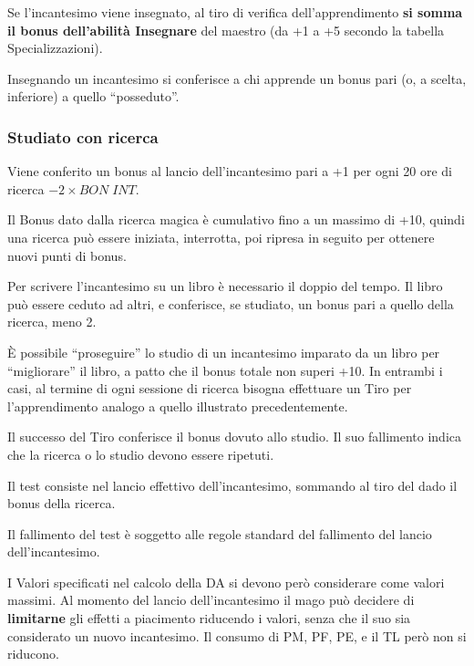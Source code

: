 Se l'incantesimo viene insegnato, al tiro di verifica
dell'apprendimento \textbf{si somma il bonus dell'abilit\`a Insegnare} del
maestro (da +1 a +5 secondo la tabella Specializzazioni).

Insegnando un incantesimo si conferisce a chi apprende un bonus pari
(o, a scelta, inferiore) a quello ``posseduto''.

\iffullversion
\subsubsection{Studiato con ricerca} Viene conferito un bonus al lancio
dell'incantesimo pari a +1 per ogni 20 ore di ricerca $-2 \times BON\;INT$. 

Il Bonus dato dalla ricerca magica \`e cumulativo fino a un massimo di
+10, quindi una ricerca pu\`o essere iniziata, interrotta, poi
ripresa in seguito per ottenere nuovi punti di bonus. 

Per scrivere l'incantesimo su un libro \`e necessario il doppio del
tempo. Il libro pu\`o essere ceduto ad altri, e conferisce, se
studiato, un bonus pari a quello della ricerca, meno 2.

\`E possibile ``proseguire'' lo studio di un incantesimo imparato da
un libro per ``migliorare'' il libro, a patto che il bonus totale non
superi +10. In entrambi i casi, al termine di ogni sessione di ricerca
bisogna effettuare un Tiro per l'apprendimento analogo a quello
illustrato precedentemente.

Il successo del Tiro conferisce il bonus dovuto allo studio.  Il suo
fallimento indica che la ricerca o lo studio devono essere ripetuti.

Il test consiste nel lancio effettivo dell'incantesimo, sommando al
tiro del dado il bonus della ricerca. 

Il fallimento del test \`e soggetto alle regole standard del
fallimento del lancio dell'incantesimo.


I Valori specificati nel calcolo della DA si devono per\`o considerare
come valori massimi. Al momento del lancio dell'incantesimo il mago
pu\`o decidere di \textbf{limitarne} gli effetti a piacimento
riducendo i valori, senza che il suo sia considerato un nuovo
incantesimo.  Il consumo di PM, PF, PE, e il TL per\`o non si
riducono.

